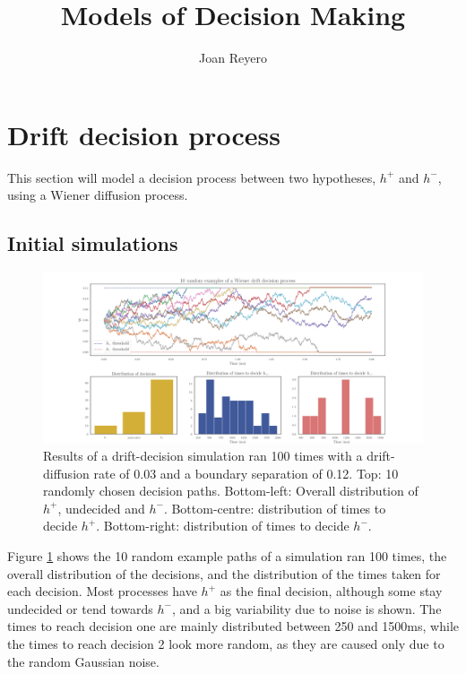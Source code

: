 \documentclass[12pt]{article}
\title{Models of Decision Making}
\author{Joan Reyero}
\begin{document}
\maketitle

\section{Drift decision process}

This section will model a decision process between two hypotheses, $h^+$ and $h^-$, using a Wiener diffusion process. 

\subsection{Initial simulations}
\begin{figure}[h!]
	\centering
	\hspace*{-0.6in}
	\includegraphics[width=1.2\linewidth]{figures/1-initial.png}
	\caption{Results of a drift-decision simulation ran 100 times with a drift-diffusion rate of 0.03 and a boundary separation of 0.12. Top: 10 randomly chosen decision paths. Bottom-left: Overall distribution of $h^+$, undecided and $h^-$. Bottom-centre: distribution of times to decide $h^+$. Bottom-right: distribution of times to decide $h^-$.}
	\label{fig:1-initial}
\end{figure}

Figure \ref{fig:1-initial} shows the 10 random example paths of a simulation ran 100 times, the overall distribution of the decisions, and the distribution of the times taken for each decision. Most processes have $h^+$ as the final decision, although some stay undecided or tend towards $h^-$, and a big variability due to noise is shown. The times to reach decision one are mainly distributed between 250 and 1500ms, while the times to reach decision 2 look more random, as they are caused only due to the random Gaussian noise.
\end{document}
